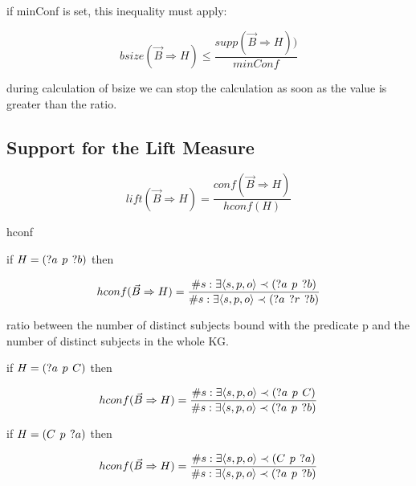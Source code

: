 if minConf is set, this inequality must apply:

$$bsize(\vec{B}\Rightarrow H) \leq \frac{supp(\vec{B} \Rightarrow H))}{minConf} $$

during calculation of bsize we can stop the calculation as soon as the value is greater than the ratio.

\subsection{Support for the Lift Measure}

$$lift(\vec{B} \Rightarrow H) = \frac{conf(\vec{B} \Rightarrow H)}{hconf(H)}$$

hconf

if $H = (?a\hspace{0.4em}p\hspace{0.4em}?b)$ then

$$hconf(\vec{B} \Rightarrow H) = \frac{\# s: \exists \langle s,p,o\rangle \prec (?a\hspace{0.4em}p\hspace{0.4em}?b) }{\# s: \exists \langle s,p,o\rangle \prec (?a\hspace{0.4em}?r\hspace{0.4em}?b) }$$

ratio between the number of distinct subjects bound with the predicate p and the number of distinct subjects in the whole KG.

if $H = (?a\hspace{0.4em}p\hspace{0.4em}C)$ then

$$hconf(\vec{B} \Rightarrow H) = \frac{\# s: \exists \langle s,p,o\rangle \prec (?a\hspace{0.4em}p\hspace{0.4em}C) }{\# s: \exists \langle s,p,o\rangle \prec (?a\hspace{0.4em}p\hspace{0.4em}?b) }$$

if $H = (C\hspace{0.4em}p\hspace{0.4em}?a)$ then

$$hconf(\vec{B} \Rightarrow H) = \frac{\# s: \exists \langle s,p,o\rangle \prec (C\hspace{0.4em}p\hspace{0.4em}?a) }{\# s: \exists \langle s,p,o\rangle \prec (?a\hspace{0.4em}p\hspace{0.4em}?b) }$$

